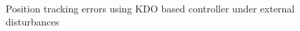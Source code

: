 \documentclass[letterpaper%
, twoside%
, 12pt%
,memoire%
, english%
,creativecommons,hyperref%
]{thETS}
\begin{document}
\begin{figure}[H]
	\centering
	 \\ \parbox{0.75\textwidth}{\caption{Position tracking errors using KDO based controller under external disturbances\label{Fig:xyzerrKDODist}}}
\end{figure}
\end{document}
